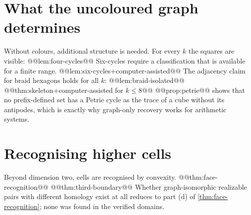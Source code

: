 \section{What the uncoloured graph determines}\label{sec:graph-only}
Without colours, additional structure is needed. For every $k$ the squares are visible:
@@lem:four-cycles@@
Six-cycles require a classification that is available for a finite range.
@@lem:six-cycles+computer-assisted@@
The adjacency claim for braid hexagons holds for all $k$:
@@lem:braid-isolated@@
@@thm:skeleton+computer-assisted for $k\le8$@@
@@prop:petrie@@
 shows that no prefix-defined set has a Petrie cycle as the trace of a cube without its antipodes, which is exactly why graph-only recovery works for arithmetic systems.

\section{Recognising higher cells}
Beyond dimension two, cells are recognised by convexity.
@@thm:face-recognition@@
@@thm:third-boundary@@
Whether graph-isomorphic realizable pairs with different homology exist at all reduces to part (d) of \cref{thm:face-recognition}; none was found in the verified domains.
